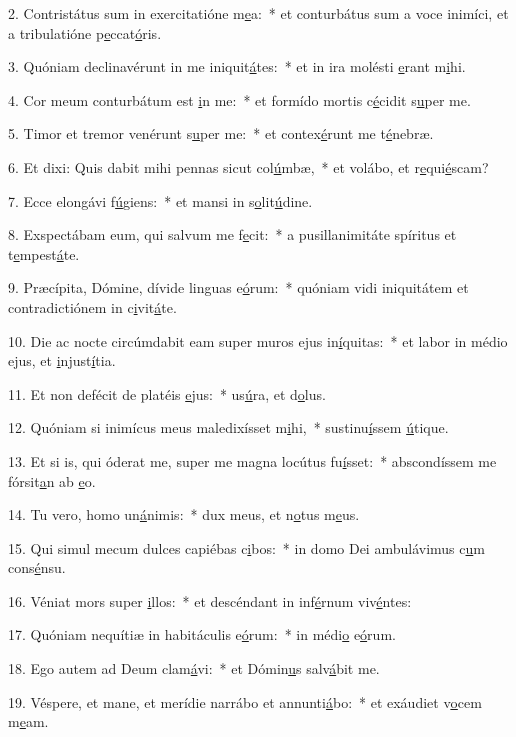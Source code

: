 2. Contristátus sum in exercitatióne m\uline{e}a:~* et conturbátus sum a voce inimíci, et a tribulatióne p\uline{e}ccat\uline{ó}ris.\par 
3. Quóniam declinavérunt in me iniquit\uline{á}tes:~* et in ira molésti \uline{e}rant m\uline{i}hi.\par 
4. Cor meum conturbátum est \uline{i}n me:~* et formído mortis c\uline{é}cidit s\uline{u}per me.\par 
5. Timor et tremor venérunt s\uline{u}per me:~* et contex\uline{é}runt me t\uline{é}nebræ.\par 
6. Et dixi: Quis dabit mihi pennas sicut col\uline{ú}mbæ,~* et volábo, et r\uline{e}qui\uline{é}scam?\par 
7. Ecce elongávi f\uline{ú}giens:~* et mansi in s\uline{o}lit\uline{ú}dine.\par 
8. Exspectábam eum, qui salvum me f\uline{e}cit:~* a pusillanimitáte spíritus et t\uline{e}mpest\uline{á}te.\par 
9. Præcípita, Dómine, dívide linguas e\uline{ó}rum:~* quóniam vidi iniquitátem et contradictiónem in c\uline{i}vit\uline{á}te.\par 
10. Die ac nocte circúmdabit eam super muros ejus in\uline{í}quitas:~* et labor in médio ejus, et \uline{i}njust\uline{í}tia.\par 
11. Et non defécit de platéis \uline{e}jus:~* us\uline{ú}ra, et d\uline{o}lus.\par 
12. Quóniam si inimícus meus maledixísset m\uline{i}hi,~* sustinu\uline{í}ssem \uline{ú}tique.\par 
13. Et si is, qui óderat me, super me magna locútus fu\uline{í}sset:~* abscondíssem me fórsit\uline{a}n ab \uline{e}o.\par 
14. Tu vero, homo un\uline{á}nimis:~* dux meus, et n\uline{o}tus m\uline{e}us.\par 
15. Qui simul mecum dulces capiébas c\uline{i}bos:~* in domo Dei ambulávimus c\uline{u}m cons\uline{é}nsu.\par 
16. Véniat mors super \uline{i}llos:~* et descéndant in inf\uline{é}rnum viv\uline{é}ntes:\par 
17. Quóniam nequítiæ in habitáculis e\uline{ó}rum:~* in médi\uline{o} e\uline{ó}rum.\par 
18. Ego autem ad Deum clam\uline{á}vi:~* et Dómin\uline{u}s salv\uline{á}bit me.\par 
19. Véspere, et mane, et merídie narrábo et annunti\uline{á}bo:~* et exáudiet v\uline{o}cem m\uline{e}am.\par 
